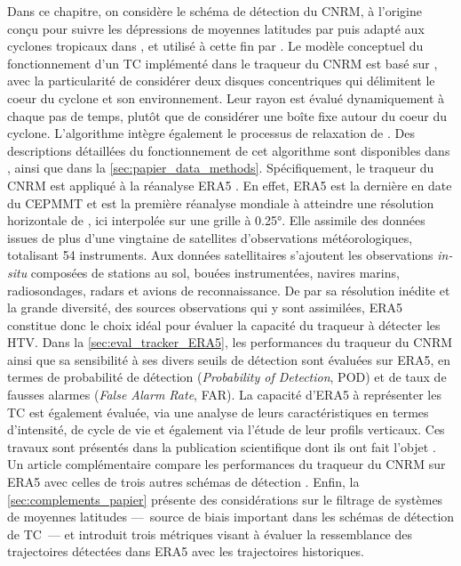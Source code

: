 \documentclass[../main.tex]{subfiles}
\begin{document}
Dans ce chapitre, on considère le schéma de détection du CNRM, à l'origine conçu pour suivre les dépressions de moyennes latitudes par
\textcite{ayrault_nouvelle_2000} puis adapté aux cyclones tropicaux dans \textcite{chauvin_response_2006}, et utilisé à cette fin par
\textcite{daloz_impact_2012,chauvin_atlantic_2017,chauvin_future_2020,cattiaux_projected_2020}. Le modèle conceptuel du fonctionnement d'un TC implémenté dans
le traqueur du CNRM est basé sur \textcite{bengtsson_hurricanetype_1995}, avec la particularité de considérer deux disques concentriques qui délimitent le coeur
du cyclone et son environnement. Leur rayon est évalué dynamiquement à chaque pas de temps, plutôt que de considérer une boîte fixe autour du coeur du cyclone.
L'algorithme intègre également le processus de relaxation de \textcite{camargo_improving_2002}. Des descriptions détaillées du fonctionnement de cet algorithme
sont disponibles dans \textcite{chauvin_response_2006}, ainsi que dans la \cref{sec:papier_data_methods}. Spécifiquement, le traqueur du CNRM est appliqué à la
réanalyse ERA5 \parencite{hersbach_era5_2020}. En effet, ERA5 est la dernière en date du CEPMMT et est la première réanalyse mondiale à atteindre une résolution
horizontale de , ici interpolée sur une grille à \ang{0.25}. Elle assimile des données issues de plus d'une vingtaine de satellites d'observations
météorologiques, totalisant \num{54} instruments. Aux données satellitaires s'ajoutent les observations \textit{in-situ} composées de stations au sol, bouées
instrumentées, navires marins, radiosondages, radars et avions de reconnaissance. De par sa résolution inédite et la grande diversité, des sources observations
qui y sont assimilées, ERA5 constitue donc le choix idéal pour évaluer la capacité du traqueur à détecter les HTV. Dans la \cref{sec:eval_tracker_ERA5}, les
performances du traqueur du CNRM ainsi que sa sensibilité à ses divers seuils de détection sont évaluées sur ERA5, en termes de probabilité de détection
(\textit{Probability of Detection}, POD) et de taux de fausses alarmes (\textit{False Alarm Rate}, FAR). La capacité d'ERA5 à représenter les TC est également
évaluée, via une analyse de leurs caractéristiques en termes d'intensité, de cycle de vie et également via l'étude de leur profils verticaux. Ces travaux sont
présentés dans la publication scientifique dont ils ont fait l'objet \parencite{dulac_assessing_2023}. Un article complémentaire compare les performances du
traqueur du CNRM sur ERA5 avec celles de trois autres schémas de détection \parencite{bourdin_intercomparison_2022}. Enfin, la \cref{sec:complements_papier}
présente des considérations sur le filtrage de systèmes de moyennes latitudes ---~source de biais important dans les schémas de détection de TC~--- et introduit
trois métriques visant à évaluer la ressemblance des trajectoires détectées dans ERA5 avec les trajectoires historiques.
\end{document}
